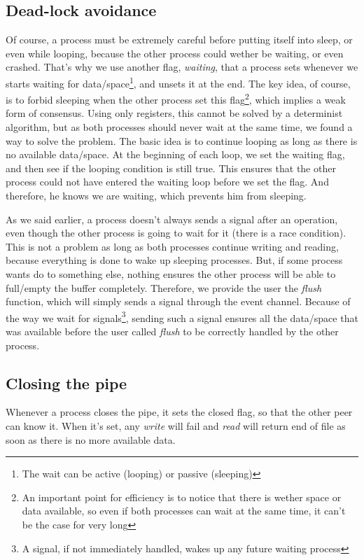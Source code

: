 \documentclass[journal]{IEEEtran}
\begin{document}
\subsection{Dead-lock avoidance}

Of course, a process must be extremely careful before putting itself into sleep, or even while looping, because the other process could wether be waiting, or even crashed. That's why we use another flag, \emph{waiting}, that a process sets whenever we starts waiting for data/space\footnote{The wait can be active (looping) or passive (sleeping)}, and unsets it at the end. The key idea, of course, is to forbid sleeping when the other process set this flag\footnote{An important point for efficiency is to notice that there is wether space or data available, so even if both processes can wait at the same time, it can't be the case for very long}, which implies a weak form of consensus.
Using only registers, this cannot be solved by a determinist algorithm, but as both processes should never wait at the same time, we found a way to solve the problem. The basic idea is to continue looping as long as there is no available data/space. At the beginning of each loop, we set the waiting flag, and then see if the looping condition is still true.
This ensures that the other process could not have entered the waiting loop before we set the flag. And therefore, he knows we are waiting, which prevents him from sleeping.

As we said earlier, a process doesn't always sends a signal after an operation, even though the other process is going to wait for it (there is a race condition). This is not a problem as long as both processes continue writing and reading, because everything is done to wake up sleeping processes. But, if some process wants do to something else, nothing ensures the other process will be able to full/empty the buffer completely. Therefore, we provide the user the \emph{flush} function, which will simply sends a signal through the event channel. Because of the way we wait for signals\footnote{A signal, if not immediately handled, wakes up any future waiting process}, sending such a signal ensures all the data/space that was available before the user called \emph{flush} to be correctly handled by the other process. 


\subsection{Closing the pipe}

Whenever a process closes the pipe, it sets the closed flag, so that the other peer can know it. When it's set, any \emph{write} will fail and \emph{read} will return end of file as soon as there is no more available data.  
\end{document}
